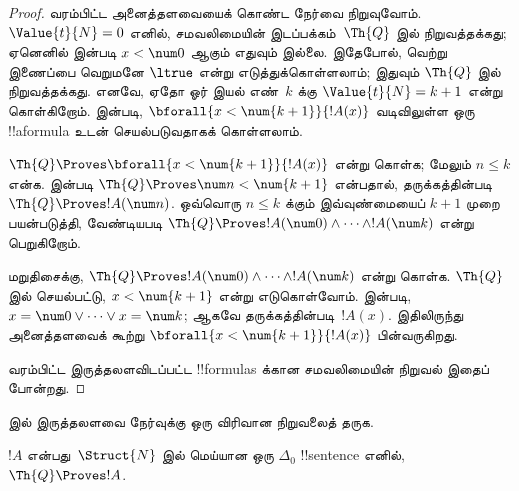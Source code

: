 \documentclass[../../../include/open-logic-section]{subfiles}
\begin{document}
\begin{proof}
வரம்பிட்ட அனைத்தளவையைக் கொண்ட நேர்வை நிறுவுவோம்.
$\Value{t}{N} = 0$ எனில், சமவலிமையின் இடப்பக்கம்~$\Th{Q}$ இல்
நிறுவத்தக்கது; ஏனெனில்  இன்படி
$x<\num 0$ ஆகும் எதுவும் இல்லை. இதேபோல்,
வெற்று இணைப்பை வெறுமனே $\ltrue$ என்று எடுத்துக்கொள்ளலாம்; இதுவும்
$\Th{Q}$ இல் நிறுவத்தக்கது.
%
எனவே, ஏதோ ஓர் இயல் எண்~$k$ க்கு $\Value{t}{N} = k+1$ என்று கொள்கிறோம்.
 இன்படி,
$\bforall{x<\num{k+1}}{!A(x)}$ வடிவிலுள்ள ஒரு !!a{formula} உடன்
செயல்படுவதாகக் கொள்ளலாம்.

$\Th{Q} \Proves \bforall{x<\num{k+1}}{!A(x)}$ என்று கொள்க; மேலும்
$n \leq k$ என்க.  இன்படி
$\Th{Q} \Proves \num n < \num{k+1}$ என்பதால், தருக்கத்தின்படி
$\Th{Q} \Proves !A(\num n)$. ஒவ்வொரு $n \leq k$ க்கும் இவ்வுண்மையைப்
$k+1$ முறை பயன்படுத்தி, வேண்டியபடி
$\Th{Q} \Proves !A(\num 0) \land \dots \land !A(\num k)$ என்று பெறுகிறோம்.

மறுதிசைக்கு,
$\Th{Q} \Proves !A(\num 0) \land \dots \land !A(\num k)$ என்று கொள்க.
$\Th{Q}$ இல் செயல்பட்டு, $x < \num{k+1}$ என்று எடுகொள்வோம்.
 இன்படி,
$x = \num 0 \lor \dots \lor x = \num k$; ஆகவே தருக்கத்தின்படி~$!A(x)$.
இதிலிருந்து அனைத்தளவைக் கூற்று
$\bforall{x<\num{k+1}}{!A(x)}$ பின்வருகிறது.

வரம்பிட்ட இருத்தலளவிடப்பட்ட !!{formula}s க்கான சமவலிமையின் நிறுவல்
இதைப் போன்றது.
\end{proof}

\begin{prob}
 இல் இருத்தலளவை நேர்வுக்கு ஒரு விரிவான
நிறுவலைத் தருக.
\end{prob}

\begin{lem}
$!A$ என்பது~$\Struct{N}$ இல் மெய்யான ஒரு $\Delta_0$ !!{sentence} எனில்,
$\Th{Q} \Proves !A$.
\end{lem}
\end{document}
